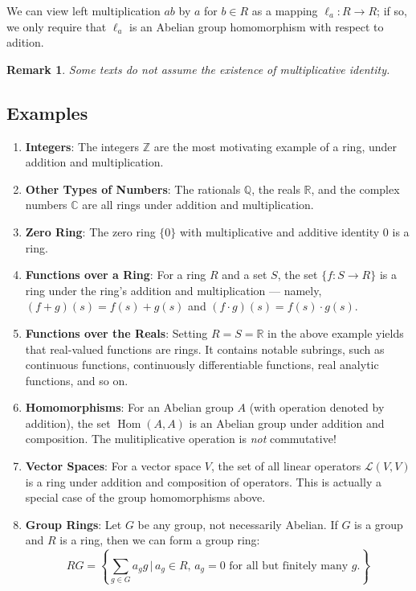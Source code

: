 \documentclass[11pt]{article}
\newtheorem{remark}{Remark}
\newcommand{\Hom}{\operatorname{Hom}}
\begin{document}
We can view left multiplication $ab$ by $a$ for $b \in R$ as a mapping $\ell_{a} : R \to R$; if so, we only require that $\ell_{a}$ is an Abelian group homomorphism with respect to adition.

\begin{remark}
	Some texts do not assume the existence of multiplicative identity.
\end{remark}

\subsection{Examples}

\begin{enumerate}
	\item \textbf{Integers}: The integers $\mathbb{Z}$ are the most motivating example of a ring, under addition and multiplication.
	\item \textbf{Other Types of Numbers}: The rationals $\mathbb{Q}$, the reals $\mathbb{R}$, and the complex numbers $\mathbb{C}$ are all rings under addition and multiplication.
	\item \textbf{Zero Ring}: The zero ring $\{ 0 \}$ with multiplicative and additive identity $0$ is a ring.
	\item \textbf{Functions over a Ring}: For a ring $R$ and a set $S$, the set $\{ f : S \to R \}$ is a ring under the ring's addition and multiplication --- namely, $(f + g)(s) = f(s) + g(s)$ and $(f \cdot g)(s) = f(s) \cdot g(s)$.
	\item \textbf{Functions over the Reals}: Setting $R = S = \mathbb{R}$ in the above example yields that real-valued functions are rings. It contains notable subrings, such as continuous functions, continuously differentiable functions, real analytic functions, and so on.
	\item \textbf{Homomorphisms}: For an Abelian group $A$ (with operation denoted by addition), the set $\Hom(A, A)$ is an Abelian group under addition and composition. The mulitiplicative operation is \textit{not} commutative!
	\item \textbf{Vector Spaces}: For a vector space $V$, the set of all linear operators $\mathcal{L}(V, V)$ is a ring under addition and composition of operators. This is actually a special case of the group homomorphisms above.
	\item \textbf{Group Rings}: Let $G$ be any group, not necessarily Abelian. If $G$ is a group and $R$ is a ring, then we can form a group ring:
	\[
		RG = \left\{ \sum\limits_{g \in G} a_{g} g \, \Big| \, a_{g} \in R, \, a_{g} = 0 \text{ for all but finitely many } g.  \right\}
\]
\end{enumerate}
\end{document}
